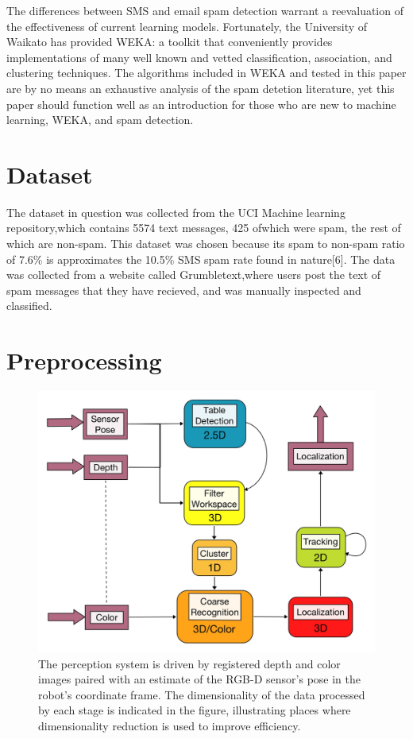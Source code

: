 \documentclass[letterpaper, 10 pt, conference]{ieeeconf}  %
\begin{document}
The differences between SMS and email spam detection warrant a
reevaluation of the effectiveness of current learning
models. Fortunately, the University of Waikato has provided WEKA: a
toolkit that conveniently provides implementations of many well known
and vetted classification, association, and clustering techniques. The
algorithms included in WEKA and tested in this paper are by no means
an exhaustive analysis of the spam detetion literature, yet this paper
should function well as an introduction for those who are new to
machine learning, WEKA, and spam detection.

\section{Dataset}
The dataset in question was collected from the UCI Machine learning
repository,which contains 5574 text messages, 425 ofwhich were spam,
the rest of which are non-spam. This dataset was chosen because its
spam to non-spam ratio of 7.6\% is approximates the 10.5\% SMS spam
rate found in nature[6]. The data was collected from a website
called Grumbletext,where users post the text of spam messages that
they have recieved, and was manually inspected and classified.


\section{Preprocessing}
\begin{figure}[t]
\centering
\includegraphics[width=0.9\columnwidth]{figures/perception-pipeline.jpg}
\caption{ The perception system is driven by registered depth and
  color images paired with an estimate of the RGB-D sensor's pose in
  the robot's coordinate frame. The dimensionality of the data
  processed by each stage is indicated in the figure, illustrating
  places where dimensionality reduction is used to improve efficiency.
}
\label{fig:perception-pipeline}
\end{figure}
\end{document}
